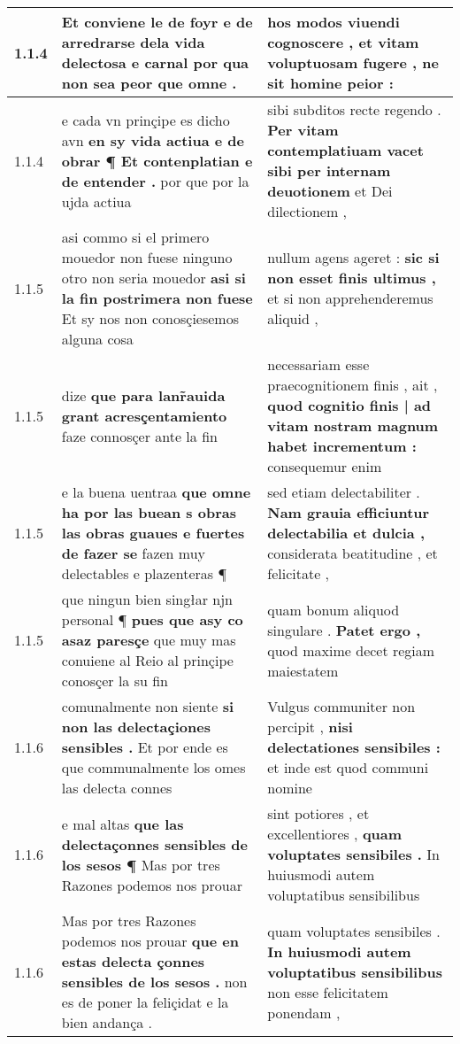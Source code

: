 \begin{tabular}{|p{1cm}|p{6.5cm}|p{6.5cm}|}
1.1.4 & Et conviene le de foyr \textbf{ e de arredrarse dela vida delectosa e carnal } por qua non sea peor que omne . & hos modos viuendi cognoscere , \textbf{ et vitam voluptuosam fugere , } ne sit homine peior : \\\hline
1.1.4 & e cada vn prinçipe es dicho avn \textbf{ en sy vida actiua e de obrar ¶ Et contenplatian e de entender . } por que por la ujda actiua & sibi subditos recte regendo . \textbf{ Per vitam contemplatiuam vacet sibi per internam deuotionem } et Dei dilectionem , \\\hline
1.1.5 & asi commo si el primero mouedor non fuese ninguno otro non seria mouedor \textbf{ asi si la fin postrimera non fuese } Et sy nos non conosçiesemos alguna cosa & nullum agens ageret : \textbf{ sic si non esset finis ultimus , } et si non apprehenderemus aliquid , \\\hline
1.1.5 & dize \textbf{ que para lanr̃auida grant acresçentamiento } faze connosçer ante la fin & necessariam esse praecognitionem finis , ait , \textbf{ quod cognitio finis | ad vitam nostram magnum habet incrementum : } consequemur enim \\\hline
1.1.5 & e la buena uentraa \textbf{ que omne ha por las buean s obras las obras guaues e fuertes de fazer se } fazen muy delectables e plazenteras ¶ & sed etiam delectabiliter . \textbf{ Nam grauia efficiuntur delectabilia et dulcia , } considerata beatitudine , et felicitate , \\\hline
1.1.5 & que ningun bien singłar njn personal ¶ \textbf{ pues que asy co asaz paresçe } que muy mas conuiene al Reio al prinçipe conosçer la su fin & quam bonum aliquod singulare . \textbf{ Patet ergo , } quod maxime decet regiam maiestatem \\\hline
1.1.6 & comunalmente non siente \textbf{ si non las delectaçiones sensibles . } Et por ende es que communalmente los omes las delecta connes & Vulgus communiter non percipit , \textbf{ nisi delectationes sensibiles : } et inde est quod communi nomine \\\hline
1.1.6 & e mal altas \textbf{ que las delectaçonnes sensibles de los sesos ¶ } Mas por tres Razones podemos nos prouar & sint potiores , et excellentiores , \textbf{ quam voluptates sensibiles . } In huiusmodi autem voluptatibus sensibilibus \\\hline
1.1.6 & Mas por tres Razones podemos nos prouar \textbf{ que en estas delecta çonnes sensibles de los sesos . } non es de poner la feliçidat e la bien andança . & quam voluptates sensibiles . \textbf{ In huiusmodi autem voluptatibus sensibilibus } non esse felicitatem ponendam , \\\hline

\end{tabular}
